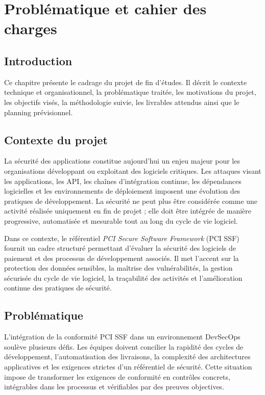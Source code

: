 \chapter{Problématique et cahier des charges}
\clearpage

\section{Introduction}

Ce chapitre présente le cadrage du projet de fin d'études. Il décrit le contexte technique et organisationnel, la problématique traitée, les motivations du projet, les objectifs visés, la méthodologie suivie, les livrables attendus ainsi que le planning prévisionnel.

\section{Contexte du projet}

La sécurité des applications constitue aujourd'hui un enjeu majeur pour les organisations développant ou exploitant des logiciels critiques. Les attaques visant les applications, les API, les chaînes d'intégration continue, les dépendances logicielles et les environnements de déploiement imposent une évolution des pratiques de développement. La sécurité ne peut plus être considérée comme une activité réalisée uniquement en fin de projet ; elle doit être intégrée de manière progressive, automatisée et mesurable tout au long du cycle de vie logiciel.

Dans ce contexte, le référentiel \textit{PCI Secure Software Framework} (PCI SSF) fournit un cadre structuré permettant d'évaluer la sécurité des logiciels de paiement et des processus de développement associés. Il met l'accent sur la protection des données sensibles, la maîtrise des vulnérabilités, la gestion sécurisée du cycle de vie logiciel, la traçabilité des activités et l'amélioration continue des pratiques de sécurité.

\section{Problématique}

L'intégration de la conformité PCI SSF dans un environnement DevSecOps soulève plusieurs défis. Les équipes doivent concilier la rapidité des cycles de développement, l'automatisation des livraisons, la complexité des architectures applicatives et les exigences strictes d'un référentiel de sécurité. Cette situation impose de transformer les exigences de conformité en contrôles concrets, intégrables dans les processus et vérifiables par des preuves objectives.

